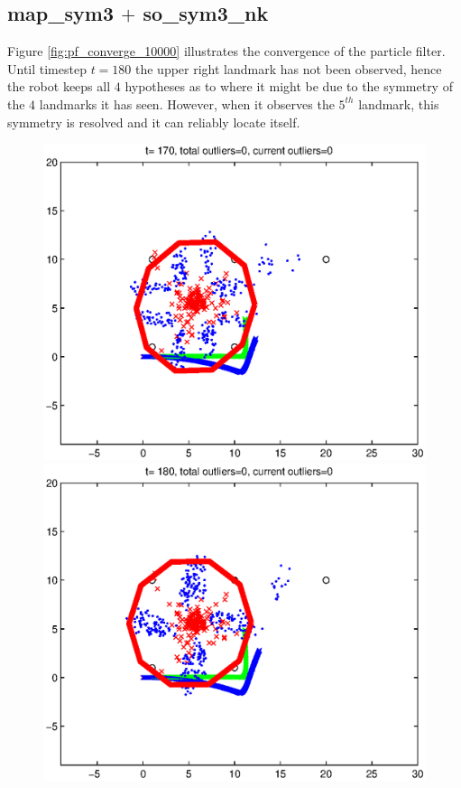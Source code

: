 \subsection{map\_sym3 $+$ so\_sym3\_nk}

Figure \ref{fig:pf_converge_10000} illustrates the convergence of the particle filter. Until timestep $t=180$ the upper right landmark has not been
observed, hence the robot keeps all $4$ hypotheses as to where it might be due to the symmetry of the $4$ landmarks it has seen. 
However, when it observes the $5^{th}$ landmark, this symmetry is resolved and it can reliably locate itself.


\begin{figure}
	\centering
	\includegraphics[scale=0.5]{./figures/M=10000/1.eps}
	\includegraphics[scale=0.5]{./figures/M=10000/2.eps}

\end{figure}
